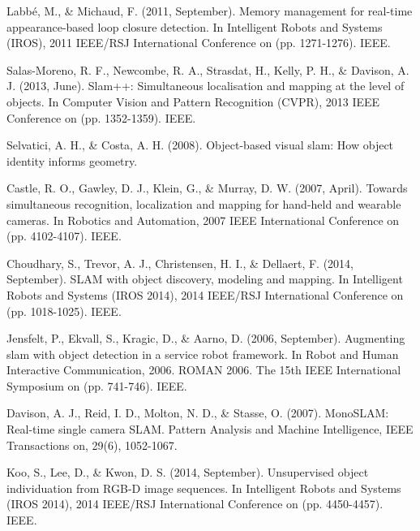 \documentclass[twoside,hidelinks]{article}
\begin{document}
\begin{thebibliography}{9}

\newblock Labbé, M., \& Michaud, F. (2011, September). Memory management for real-time appearance-based loop closure detection. In Intelligent Robots and Systems (IROS), 2011 IEEE/RSJ International Conference on (pp. 1271-1276). IEEE.


\newblock Salas-Moreno, R. F., Newcombe, R. A., Strasdat, H., Kelly, P. H., \& Davison, A. J. (2013, June). Slam++: Simultaneous localisation and mapping at the level of objects. In Computer Vision and Pattern Recognition (CVPR), 2013 IEEE Conference on (pp. 1352-1359). IEEE.

\newblock Selvatici, A. H., \& Costa, A. H. (2008). Object-based visual slam: How object identity informs geometry.

\newblock Castle, R. O., Gawley, D. J., Klein, G., \& Murray, D. W. (2007, April). Towards simultaneous recognition, localization and mapping for hand-held and wearable cameras. In Robotics and Automation, 2007 IEEE International Conference on (pp. 4102-4107). IEEE.


\newblock Choudhary, S., Trevor, A. J., Christensen, H. I., \& Dellaert, F. (2014, September). SLAM with object discovery, modeling and mapping. In Intelligent Robots and Systems (IROS 2014), 2014 IEEE/RSJ International Conference on (pp. 1018-1025). IEEE.

\newblock Jensfelt, P., Ekvall, S., Kragic, D., \& Aarno, D. (2006, September). Augmenting slam with object detection in a service robot framework. In Robot and Human Interactive Communication, 2006. ROMAN 2006. The 15th IEEE International Symposium on (pp. 741-746). IEEE.

\newblock Davison, A. J., Reid, I. D., Molton, N. D., \& Stasse, O. (2007). MonoSLAM: Real-time single camera SLAM. Pattern Analysis and Machine Intelligence, IEEE Transactions on, 29(6), 1052-1067.

\newblock Koo, S., Lee, D., \& Kwon, D. S. (2014, September). Unsupervised object individuation from RGB-D image sequences. In Intelligent Robots and Systems (IROS 2014), 2014 IEEE/RSJ International Conference on (pp. 4450-4457). IEEE.




\end{thebibliography}
\end{document}
